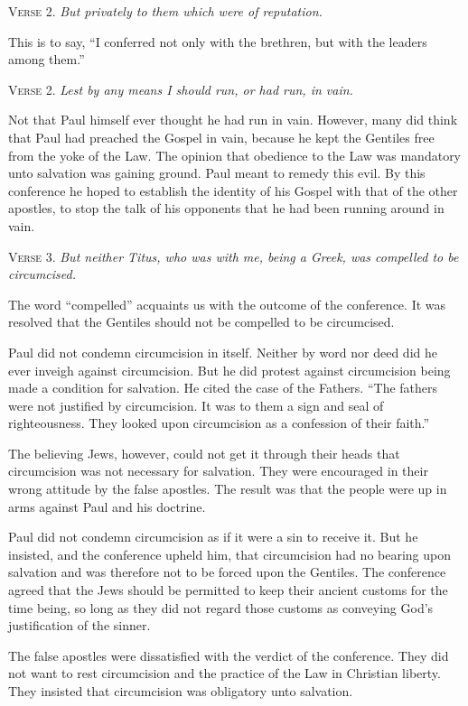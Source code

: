 \textsc{Verse} 2. \emph{But privately to them which were of reputation.}

This is to say, “I conferred not only with the brethren, but with the leaders among them.”

\textsc{Verse} 2. \emph{Lest by any means I should run, or had run, in vain.}

Not that Paul himself ever thought he had run in vain. However, many did think that Paul had preached the Gospel in vain, because he kept the Gentiles free from the yoke of the Law. The opinion that obedience to the Law was mandatory unto salvation was gaining ground. Paul meant to remedy this evil. By this conference he hoped to establish the identity of his Gospel with that of the other apostles, to stop the talk of his opponents that he had been running around in vain.

\textsc{Verse} 3. \emph{But neither Titus, who was with me, being a Greek, was compelled to be circumcised.}

The word “compelled” acquaints us with the outcome of the conference. It was resolved that the Gentiles should not be compelled to be circumcised.

Paul did not condemn circumcision in itself. Neither by word nor deed did he ever inveigh against circumcision. But he did protest against circumcision being made a condition for salvation. He cited the case of the Fathers. “The fathers were not justified by circumcision. It was to them a sign and seal of righteousness. They looked upon circumcision as a confession of their faith.”

The believing Jews, however, could not get it through their heads that circumcision was not necessary for salvation. They were encouraged in their wrong attitude by the false apostles. The result was that the people were up in arms against Paul and his doctrine.

Paul did not condemn circumcision as if it were a sin to receive it. But he insisted, and the conference upheld him, that circumcision had no bearing upon salvation and was therefore not to be forced upon the Gentiles. The conference agreed that the Jews should be permitted to keep their ancient customs for the time being, so long as they did not regard those customs as conveying God’s justification of the sinner.

The false apostles were dissatisfied with the verdict of the conference. They did not want to rest circumcision and the practice of the Law in Christian liberty. They insisted that circumcision was obligatory unto salvation.

